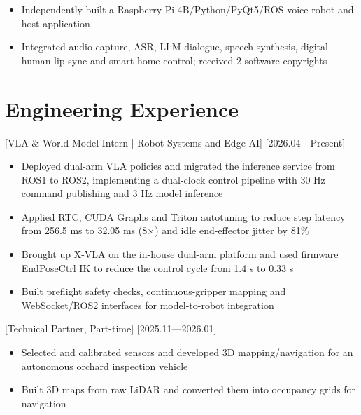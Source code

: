\documentclass{resume-photo}
\begin{document}
\begin{itemize}
  \item Independently built a Raspberry Pi 4B/Python/PyQt5/ROS voice robot and host application
  \item Integrated audio capture, ASR, LLM dialogue, speech synthesis, digital-human lip sync and smart-home control; received 2 software copyrights
\end{itemize}

\section{Engineering Experience}

[\textnormal{VLA \& World Model Intern | Robot Systems and Edge AI}]
[2026.04—Present]

\begin{itemize}
  \item Deployed dual-arm VLA policies and migrated the inference service from ROS1 to ROS2, implementing a dual-clock control pipeline with 30 Hz command publishing and 3 Hz model inference
  \item Applied RTC, CUDA Graphs and Triton autotuning to reduce step latency from 256.5 ms to 32.05 ms (8$\times$) and idle end-effector jitter by 81\%
  \item Brought up X-VLA on the in-house dual-arm platform and used firmware EndPoseCtrl IK to reduce the control cycle from 1.4 s to 0.33 s
  \item Built preflight safety checks, continuous-gripper mapping and WebSocket/ROS2 interfaces for model-to-robot integration
\end{itemize}

[\textnormal{Technical Partner, Part-time}]
[2025.11—2026.01]

\begin{itemize}
  \item Selected and calibrated sensors and developed 3D mapping/navigation for an autonomous orchard inspection vehicle
  \item Built 3D maps from raw LiDAR and converted them into occupancy grids for navigation
\end{itemize}
\end{document}

